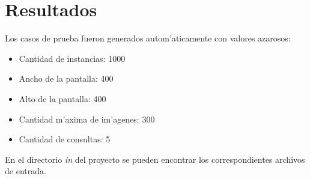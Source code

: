 \section{Resultados}
Los casos de prueba fueron generados autom'aticamente con valores azarosos:
\begin{itemize}
\item Cantidad de instancias: 1000
\item Ancho de la pantalla: 400
\item Alto de la pantalla: 400
\item Cantidad m'axima de im'agenes: 300
\item Cantidad de consultas: 5
\end{itemize}
En el directorio \emph{in} del proyecto se pueden encontrar los correspondientes archivos de entrada.

